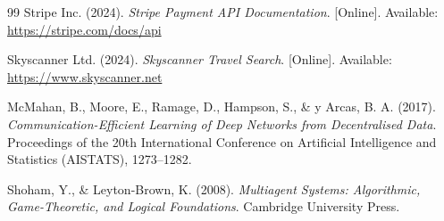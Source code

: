 \documentclass[12pt, a4paper]{article}
\begin{document}
\begin{thebibliography}{99}
Stripe Inc. (2024).
\textit{Stripe Payment API Documentation}.
[Online]. Available: \url{https://stripe.com/docs/api}

Skyscanner Ltd. (2024).
\textit{Skyscanner Travel Search}.
[Online]. Available: \url{https://www.skyscanner.net}

McMahan, B., Moore, E., Ramage, D., Hampson, S., \& y Arcas, B. A. (2017).
\textit{Communication-Efficient Learning of Deep Networks from Decentralised Data}.
Proceedings of the 20th International Conference on Artificial Intelligence and Statistics (AISTATS), 1273--1282.

Shoham, Y., \& Leyton-Brown, K. (2008).
\textit{Multiagent Systems: Algorithmic, Game-Theoretic, and Logical Foundations}.
Cambridge University Press.

\end{thebibliography}
\end{document}
